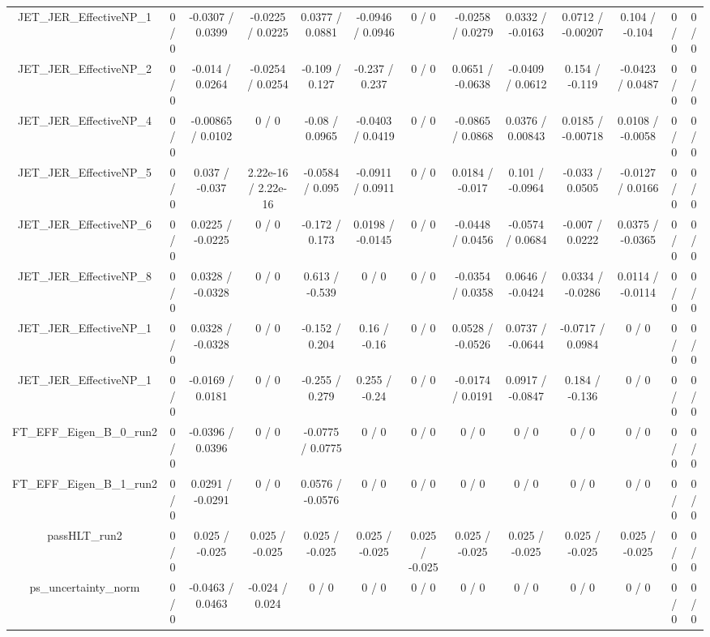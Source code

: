 \documentclass[10pt]{article}
\begin{document}
\begin{table}[htbp]
\begin{center}
\begin{tabular}{|c|c|c|c|c|c|c|c|c|c|c|c|c|}
  JET_JER_EffectiveNP_1 & 0 / 0 & -0.0307 / 0.0399 & -0.0225 / 0.0225 & 0.0377 / 0.0881 & -0.0946 / 0.0946 & 0 / 0 & -0.0258 / 0.0279 & 0.0332 / -0.0163 & 0.0712 / -0.00207 & 0.104 / -0.104 & 0 / 0 & 0 / 0 \\ 
  JET_JER_EffectiveNP_2 & 0 / 0 & -0.014 / 0.0264 & -0.0254 / 0.0254 & -0.109 / 0.127 & -0.237 / 0.237 & 0 / 0 & 0.0651 / -0.0638 & -0.0409 / 0.0612 & 0.154 / -0.119 & -0.0423 / 0.0487 & 0 / 0 & 0 / 0 \\ 
  JET_JER_EffectiveNP_4 & 0 / 0 & -0.00865 / 0.0102 & 0 / 0 & -0.08 / 0.0965 & -0.0403 / 0.0419 & 0 / 0 & -0.0865 / 0.0868 & 0.0376 / 0.00843 & 0.0185 / -0.00718 & 0.0108 / -0.0058 & 0 / 0 & 0 / 0 \\ 
  JET_JER_EffectiveNP_5 & 0 / 0 & 0.037 / -0.037 & 2.22e-16 / 2.22e-16 & -0.0584 / 0.095 & -0.0911 / 0.0911 & 0 / 0 & 0.0184 / -0.017 & 0.101 / -0.0964 & -0.033 / 0.0505 & -0.0127 / 0.0166 & 0 / 0 & 0 / 0 \\ 
  JET_JER_EffectiveNP_6 & 0 / 0 & 0.0225 / -0.0225 & 0 / 0 & -0.172 / 0.173 & 0.0198 / -0.0145 & 0 / 0 & -0.0448 / 0.0456 & -0.0574 / 0.0684 & -0.007 / 0.0222 & 0.0375 / -0.0365 & 0 / 0 & 0 / 0 \\ 
  JET_JER_EffectiveNP_8 & 0 / 0 & 0.0328 / -0.0328 & 0 / 0 & 0.613 / -0.539 & 0 / 0 & 0 / 0 & -0.0354 / 0.0358 & 0.0646 / -0.0424 & 0.0334 / -0.0286 & 0.0114 / -0.0114 & 0 / 0 & 0 / 0 \\ 
  JET_JER_EffectiveNP_1 & 0 / 0 & 0.0328 / -0.0328 & 0 / 0 & -0.152 / 0.204 & 0.16 / -0.16 & 0 / 0 & 0.0528 / -0.0526 & 0.0737 / -0.0644 & -0.0717 / 0.0984 & 0 / 0 & 0 / 0 & 0 / 0 \\ 
  JET_JER_EffectiveNP_1 & 0 / 0 & -0.0169 / 0.0181 & 0 / 0 & -0.255 / 0.279 & 0.255 / -0.24 & 0 / 0 & -0.0174 / 0.0191 & 0.0917 / -0.0847 & 0.184 / -0.136 & 0 / 0 & 0 / 0 & 0 / 0 \\ 
  FT_EFF_Eigen_B_0_run2 & 0 / 0 & -0.0396 / 0.0396 & 0 / 0 & -0.0775 / 0.0775 & 0 / 0 & 0 / 0 & 0 / 0 & 0 / 0 & 0 / 0 & 0 / 0 & 0 / 0 & 0 / 0 \\ 
  FT_EFF_Eigen_B_1_run2 & 0 / 0 & 0.0291 / -0.0291 & 0 / 0 & 0.0576 / -0.0576 & 0 / 0 & 0 / 0 & 0 / 0 & 0 / 0 & 0 / 0 & 0 / 0 & 0 / 0 & 0 / 0 \\ 
  passHLT_run2 & 0 / 0 & 0.025 / -0.025 & 0.025 / -0.025 & 0.025 / -0.025 & 0.025 / -0.025 & 0.025 / -0.025 & 0.025 / -0.025 & 0.025 / -0.025 & 0.025 / -0.025 & 0.025 / -0.025 & 0 / 0 & 0 / 0 \\ 
  ps_uncertainty_norm & 0 / 0 & -0.0463 / 0.0463 & -0.024 / 0.024 & 0 / 0 & 0 / 0 & 0 / 0 & 0 / 0 & 0 / 0 & 0 / 0 & 0 / 0 & 0 / 0 & 0 / 0 \\ 

\end{tabular}
\end{center}
\end{table}
\end{document}
